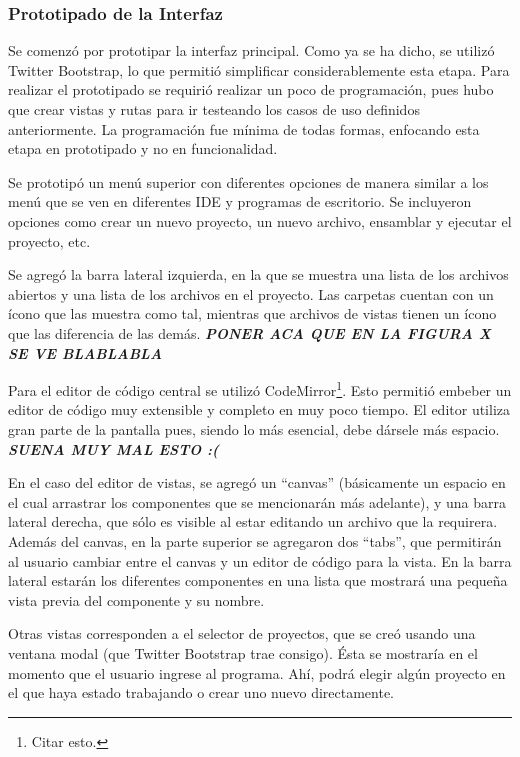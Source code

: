 \documentclass[12pt,titlepage,]{article}
\begin{document}
\subsubsection{Prototipado de la Interfaz}

Se comenzó por prototipar la interfaz principal. Como ya se ha dicho, se
utilizó Twitter Bootstrap, lo que permitió simplificar considerablemente
esta etapa. Para realizar el prototipado se requirió realizar un poco de
programación, pues hubo que crear vistas y rutas para ir testeando los
casos de uso definidos anteriormente. La programación fue mínima de
todas formas, enfocando esta etapa en prototipado y no en funcionalidad.

Se prototipó un menú superior con diferentes opciones de manera similar
a los menú que se ven en diferentes IDE y programas de escritorio. Se
incluyeron opciones como crear un nuevo proyecto, un nuevo archivo,
ensamblar y ejecutar el proyecto, etc.

Se agregó la barra lateral izquierda, en la que se muestra una lista de
los archivos abiertos y una lista de los archivos en el proyecto. Las
carpetas cuentan con un ícono que las muestra como tal, mientras que
archivos de vistas tienen un ícono que las diferencia de las demás.
\textbf{\emph{PONER ACA QUE EN LA FIGURA X SE VE BLABLABLA}}

Para el editor de código central se utilizó CodeMirror\footnote{Citar
  esto.}. Esto permitió embeber un editor de código muy extensible y
completo en muy poco tiempo. El editor utiliza gran parte de la pantalla
pues, siendo lo más esencial, debe dársele más espacio.
\textbf{\emph{SUENA MUY MAL ESTO :(}}

En el caso del editor de vistas, se agregó un ``canvas'' (básicamente un
espacio en el cual arrastrar los componentes que se mencionarán más
adelante), y una barra lateral derecha, que sólo es visible al estar
editando un archivo que la requirera. Además del canvas, en la parte
superior se agregaron dos ``tabs'', que permitirán al usuario cambiar
entre el canvas y un editor de código para la vista. En la barra lateral
estarán los diferentes componentes en una lista que mostrará una pequeña
vista previa del componente y su nombre.

Otras vistas corresponden a el selector de proyectos, que se creó usando
una ventana modal (que Twitter Bootstrap trae consigo). Ésta se
mostraría en el momento que el usuario ingrese al programa. Ahí, podrá
elegir algún proyecto en el que haya estado trabajando o crear uno nuevo
directamente.
\end{document}
